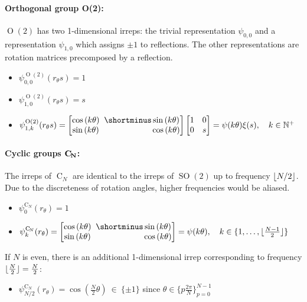 \documentclass{article}
\newcommand{\lp}{\left(}
\newcommand{\rp}{\right)}
\renewcommand{\O}[1]{\ensuremath{\operatorname{O}(#1)}}
\newcommand{\SO}[1]{\ensuremath{\operatorname{SO}(#1)}}
\newcommand{\CN}{\ensuremath{\operatorname{C}_{\!N}}}
\newcommand{\bCN}{\ensuremath{\mathbf{\operatorname{\bf C}_{\!N}}}}
\newcommand{\PSI}[1]{
	\begin{bmatrix}
		\cos\lp#1\rp & \!\!\!         \shortminus \sin\lp#1\rp \\
		\sin\lp#1\rp & \!\!\!\phantom{\shortminus}\cos\lp#1\rp \\
	\end{bmatrix}
}
\DeclarePairedDelimiter{\floor}{\lfloor}{\rfloor}
\begin{document}
\paragraph{Orthogonal group O(2):}
$\O2$ has two 1-dimensional irreps: the trivial representation $\psi_{0,0}$ and a representation $\psi_{1, 0}$ which assigns $\pm1$ to reflections.
The other representations are rotation matrices precomposed by a reflection.
\begin{itemize}
\renewcommand\labelitemi{--}
	\item $\psi_{0,0}^{\O2}(r_\theta s)=1$ 
	\item $\psi_{1, 0}^{\O2}(r_\theta s)=s$
	\item $\psi_{1, k}^{\O2}(r_\theta s) = 
	\PSI{k\theta}
	\begin{bmatrix}
		1 & 0 \\
		0 & s \\
	\end{bmatrix} = \psi(k\theta)\xi(s),
	\quad k\in\mathbb{N^+}$\end{itemize}


\paragraph{Cyclic groups $\bCN$:}
The irreps of $\CN$ are identical to the irreps of $\SO2$ up to frequency $\floor{N/2}$.
Due to the discreteness of rotation angles, higher frequencies would be aliased.
\begin{itemize}
\renewcommand\labelitemi{--}
	\item $\psi_0^{\CN}(r_\theta) = 1 $
	\item $\psi_k^{\CN}(r_\theta) = \PSI{k\theta} = \psi(k\theta), \quad k \in\{1, \dots, \floor{{N-1\over2}}\}$
\end{itemize}
If $N$ is even, there is an additional 1-dimensional irrep corresponding to frequency $\floor{{N\over2}}={N\over2}$:
\begin{itemize}
\renewcommand\labelitemi{--}
	\item $\psi_{N/2}^{\CN}(r_\theta) = \cos\left(\frac{N}{2} \theta\right)\ \in\ \{\pm1\}$ since $\theta\in\{p\frac{2\pi}{N}\}_{p=0}^{N-1}$
\end{itemize}
\end{document}
